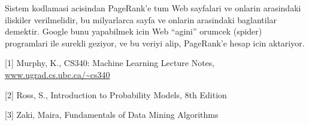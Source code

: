 \documentclass[12pt,fleqn]{article}\usepackage{../common}
\begin{document}
Sistem kodlamasi acisindan PageRank'e tum Web sayfalari ve onlarin
arasindaki iliskiler verilmelidir, bu milyarlarca sayfa ve onlarin
arasindaki baglantilar demektir. Google bunu yapabilmek icin Web ``agini''
orumcek (spider) programlari ile surekli geziyor, ve bu veriyi alip,
PageRank'e hesap icin aktariyor.

[1] Murphy, K., CS340: Machine Learning Lecture Notes, \url{www.ugrad.cs.ubc.ca/~cs340}

[2] Ross, S., Introduction to Probability Models, 8th Edition

[3] Zaki, Maira, Fundamentals of Data Mining Algorithms
\end{document}
